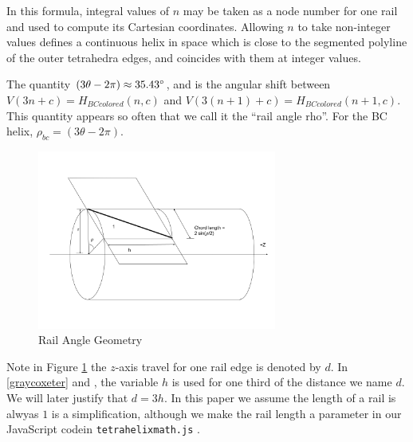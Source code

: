 \documentclass[11pt]{article}
\begin{document}
In this formula, integral values of $n$ may be taken as a node number for one rail and used to compute its Cartesian
coordinates. Allowing $n$ to take non-integer values defines a continuous
helix in space which is close to the segmented polyline of the outer tetrahedra edges, and coincides with them at integer
values.

The quantity $ (3 \theta - 2 \pi) \approx 35.43 \degree $, and is the angular shift between $V(3n+c)=H_{BCcolored}(n,c)$ and
$V(3(n+1)+c)=H_{BCcolored}(n+1,c)$.
This quantity appears so often that we call it the ``rail angle rho''. For the BC helix, $\rho_{bc} = (3 \theta - 2 \pi)$.

\begin{figure}[H]
  \label{railanglefig}
     \centering
     \includegraphics[width=0.7\textwidth]{figures/RailAngleGeometry.png}
     \caption{Rail Angle Geometry}
\end{figure}

Note in Figure \ref{railanglefig} the $z$-axis travel for one rail edge is denoted by $d$. In \eqref{graycoxeter} and \label{eq:colored}, the variable
$h$ is used for one third of the distance we name $d$. We will later justify that $d = 3h$. In this paper we assume the length of a rail
is alwyas $1$ is a simplification, although we make the rail length a parameter in our JavaScript codein \texttt{tetrahelixmath.js} \cite{readtetrahelix}.
\end{document}

